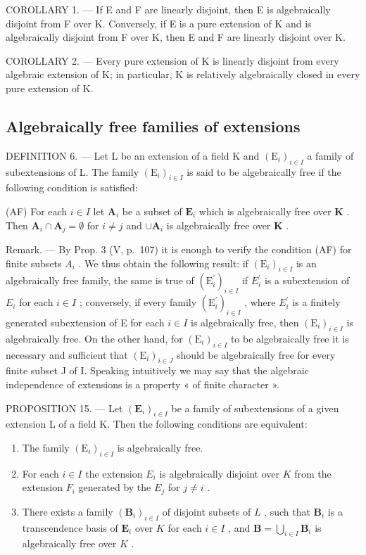 COROLLARY 1. --- If E and F are linearly disjoint, then E is algebraically disjoint from F over K. Conversely, if E is a pure extension of K and is algebraically disjoint from F over K, then E and F are linearly disjoint over K.

COROLLARY 2. --- Every pure extension of K is linearly disjoint from every algebraic extension of K; in particular, K is relatively algebraically closed in every pure extension of K.

\subsection{Algebraically free families of extensions}

DEFINITION 6. --- Let L be an extension of a field K and \((\mathrm{E}_{i})_{i\in I}\) a family of subextensions of L. The family \((\mathrm{E}_{i})_{i\in I}\) is said to be algebraically free if the following condition is satisfied:

(AF) For each \(i \in I\) let \(\mathbf{A}_i\) be a subset of \(\mathbf{E}_i\) which is algebraically free over \(\mathbf{K}\) . Then \(\mathbf{A}_i \cap \mathbf{A}_j = \emptyset\) for \(i \neq j\) and \(\cup \mathbf{A}_i\) is algebraically free over \(\mathbf{K}\) .

Remark. --- By Prop. 3 (V, p.~107) it is enough to verify the condition (AF) for finite subsets \(A_{i}\) . We thus obtain the following result: if \((\mathrm{E}_{i})_{i\in I}\) is an algebraically free family, the same is true of \((\mathrm{E}_{i}^{\prime})_{i\in I}\) if \(E_{i}^{\prime}\) is a subextension of \(E_{i}\) for each \(i\in I\) ; conversely, if every family \((\mathrm{E}_{i}^{\prime})_{i\in I}\) , where \(E_{i}^{\prime}\) is a finitely generated subextension of E for each \(i\in I\) is algebraically free, then \((\mathrm{E}_{i})_{i\in I}\) is algebraically free. On the other hand, for \((\mathrm{E}_{i})_{i\in I}\) to be algebraically free it is necessary and sufficient that \((\mathrm{E}_{i})_{i\in J}\) should be algebraically free for every finite subset J of I. Speaking intuitively we may say that the algebraic independence of extensions is a property « of finite character ».

PROPOSITION 15. --- Let \((\mathbf{E}_i)_{i\in I}\) be a family of subextensions of a given extension L of a field K. Then the following conditions are equivalent:

\begin{enumerate}
\def\labelenumi{\alph{enumi})}
\item
  The family \((\mathrm{E}_i)_{i\in I}\) is algebraically free.
\item
  For each \(i \in I\) the extension \(E_i\) is algebraically disjoint over \(K\) from the extension \(F_i\) generated by the \(E_j\) for \(j \neq i\) .
\item
  There exists a family \((\mathbf{B}_i)_{i\in I}\) of disjoint subsets of \(L\) , such that \(\mathbf{B}_i\) is a transcendence basis of \(\mathbf{E}_i\) over \(K\) for each \(i\in I\) , and \(\mathbf{B} = \bigcup_{i\in I}\mathbf{B}_i\) is algebraically free over \(K\) .
\end{enumerate}

